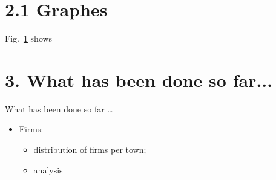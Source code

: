 \documentclass[xcolor=dvipsnames]{beamer}
\begin{document}
\section{2.1 Graphes}
\begin{frame}
Fig.~\ref{fig3} shows 
\begin{figure}[!ht] 
	\centering
	\caption{} 
	\label{fig3}
\end{figure}
\end{frame}


\section{3. What has been done so far...}
\begin{frame}{\vskip 0.05cm\centerline{\Huge\textcolor{bscuro}{What has been done so far \ldots}}}
\begin{itemize}
	\item Firms:
	\begin{itemize}
		\item distribution of firms per town;
		\item analysis
	\end{itemize}
\end{itemize}
\end{frame}
\end{document}
